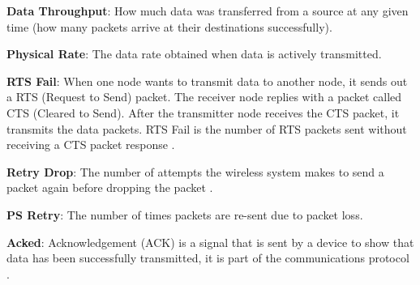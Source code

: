 \textbf{Data Throughput}: How much data was transferred from a source at any given time (how many packets arrive at their destinations successfully). 

\textbf{Physical Rate}: The data rate obtained when data is actively transmitted. 

\textbf{RTS Fail}: When one node wants to transmit data to another node, it sends out a RTS (Request to Send) packet. The receiver node replies with a packet called CTS (Cleared to Send). After the transmitter node receives the CTS packet, it transmits the data packets. RTS Fail is the number of RTS packets sent without receiving a CTS packet response \cite{Karn1990MACAaNC}. 

\textbf{Retry Drop}: The number of attempts the wireless system makes to send a packet again before dropping the packet \cite{RetryDrop}. 

\textbf{PS  Retry}: The number of times packets are re-sent due to packet loss.  

\textbf{Acked}: Acknowledgement (ACK) is a signal that is sent by a device to show that data has been successfully transmitted, it is part of the communications protocol \cite{ackSignal}.


